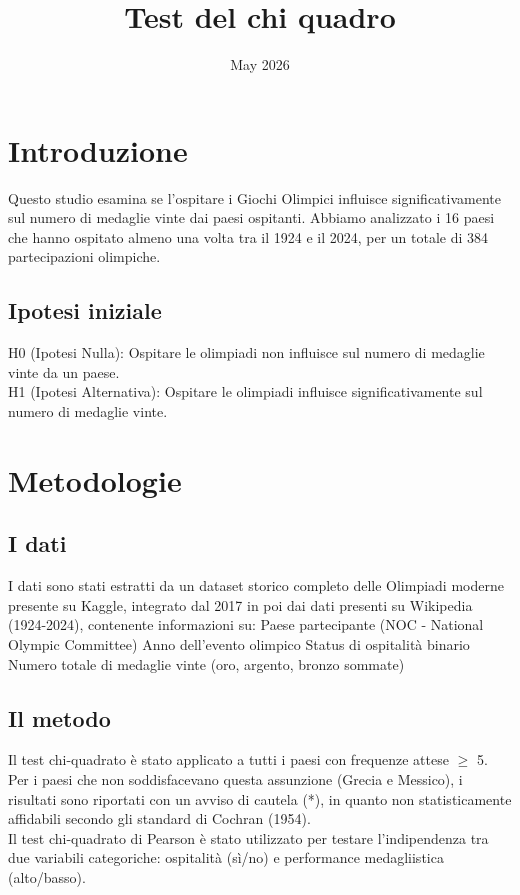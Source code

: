 \documentclass{article}
\title{Test del chi quadro}
\date{May 2026}
\begin{document}
\maketitle

\section{Introduzione}
Questo studio esamina se l'ospitare i Giochi Olimpici influisce significativamente 
sul numero di medaglie vinte dai paesi ospitanti. Abbiamo analizzato i 16 paesi 
che hanno ospitato almeno una volta tra il 1924 e il 2024, per un totale di 384 
partecipazioni olimpiche. 
\subsection{Ipotesi iniziale}
H0 (Ipotesi Nulla): Ospitare le olimpiadi non influisce sul numero di medaglie 
vinte da un paese.\\
H1 (Ipotesi Alternativa): Ospitare le olimpiadi influisce significativamente sul
numero di medaglie vinte.

\section{Metodologie}
\subsection{I dati}
I dati sono stati estratti da un dataset storico completo delle Olimpiadi moderne
presente su Kaggle, integrato dal 2017 in poi dai dati presenti su Wikipedia
(1924-2024), contenente informazioni su:
Paese partecipante (NOC - National Olympic Committee)
Anno dell'evento olimpico
Status di ospitalità binario
Numero totale di medaglie vinte (oro, argento, bronzo sommate)

\subsection{Il metodo}
Il test chi-quadrato è stato applicato a tutti i paesi con frequenze attese $\ge$ 
5. Per i paesi che non soddisfacevano questa assunzione (Grecia e Messico), i 
risultati sono riportati con un avviso di cautela (*), in quanto non 
statisticamente affidabili secondo gli standard di Cochran (1954).\\
Il test chi-quadrato di Pearson è stato utilizzato per testare l'indipendenza 
tra due variabili categoriche: ospitalità (sì/no) e performance medagliistica 
(alto/basso).
\end{document}
